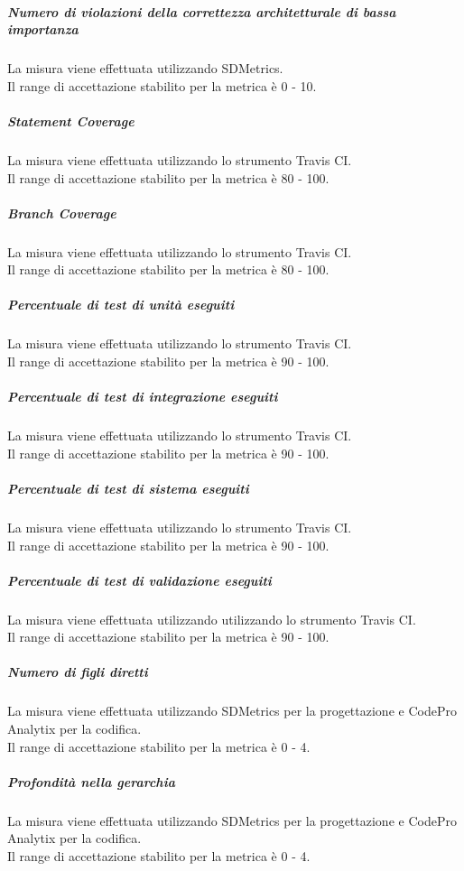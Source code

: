			\subparagraph{Numero di violazioni della correttezza architetturale di bassa importanza}
			La misura viene effettuata utilizzando SDMetrics.
			\\Il range di accettazione stabilito per la metrica è 0 - 10.
			
			\subparagraph{Statement Coverage}
			La misura viene effettuata utilizzando lo strumento Travis CI.
			\\Il range di accettazione stabilito per la metrica è 80 - 100.
			
			\subparagraph{Branch Coverage}
			La misura viene effettuata utilizzando lo strumento Travis CI.
			\\Il range di accettazione stabilito per la metrica è 80 - 100.
			
			\subparagraph{Percentuale di test di unità eseguiti}
			La misura viene effettuata utilizzando lo strumento Travis CI.
			\\Il range di accettazione stabilito per la metrica è 90 - 100.
			
			\subparagraph{Percentuale di test di integrazione eseguiti}
			La misura viene effettuata utilizzando lo strumento Travis CI.
			\\Il range di accettazione stabilito per la metrica è 90 - 100.
			
			\subparagraph{Percentuale di test di sistema eseguiti}
			La misura viene effettuata utilizzando lo strumento Travis CI.
			\\Il range di accettazione stabilito per la metrica è 90 - 100.
			
			\subparagraph{Percentuale di test di validazione eseguiti}
			La misura viene effettuata utilizzando utilizzando lo strumento Travis CI.
			\\Il range di accettazione stabilito per la metrica è 90 - 100.
			
			\subparagraph{Numero di figli diretti}
			La misura viene effettuata utilizzando SDMetrics per la progettazione e CodePro Analytix per la codifica.
			\\Il range di accettazione stabilito per la metrica è 0 - 4.
			
			\subparagraph{Profondità nella gerarchia}
			La misura viene effettuata utilizzando SDMetrics per la progettazione e CodePro Analytix per la codifica.
			\\Il range di accettazione stabilito per la metrica è 0 - 4.

